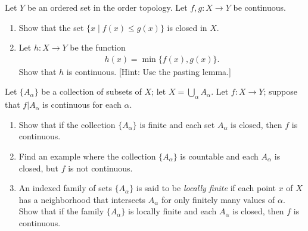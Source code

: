   \begin{exercise}[Munkres 18.8]
    Let $Y$ be an ordered set in the order topology. Let $f, g : X \to Y$ be continuous.
    \begin{enumerate}
      \item Show that the set $\{x \mid f(x) \leq g(x)\}$ is closed in $X$.
      \item Let $h : X \to Y$ be the function
      \begin{align*}
        h(x) = \min\{f(x), g(x)\}.
      \end{align*}
      Show that $h$ is continuous. [Hint: Use the pasting lemma.]
    \end{enumerate}
  \end{exercise}

  \begin{exercise}[Munkres 18.9]
    Let $\{A_\alpha\}$ be a collection of subsets of $X$; let $X = \bigcup_\alpha A_\alpha$. Let $f : X \to Y$; suppose that $f|A_\alpha$ is continuous for each $\alpha$.
    \begin{enumerate}
      \item Show that if the collection $\{A_\alpha\}$ is finite and each set $A_\alpha$ is closed, then $f$ is continuous.
      \item Find an example where the collection $\{A_\alpha\}$ is countable and each $A_\alpha$ is closed, but $f$ is not continuous.
      \item An indexed family of sets $\{A_\alpha\}$ is said to be \textit{locally finite} if each point $x$ of $X$ has a neighborhood that intersects $A_\alpha$ for only finitely many values of $\alpha$. Show that if the family $\{A_\alpha\}$ is locally finite and each $A_\alpha$ is closed, then $f$ is continuous.
    \end{enumerate}
  \end{exercise}

